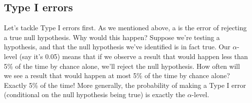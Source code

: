 




\subsection{Type I errors}



Let's tackle Type I errors first. As we mentioned above, a  is the error of rejecting a true null hypothesis. Why would this happen? Suppose we're testing a hypothesis, and that the null hypothesis we've identified is in fact true. Our $\alpha$-level (say it's 0.05) means that if we observe a result that would happen less than 5\% of the time by chance alone, we'll reject the null hypothesis. How often will we see a result that would happen at most 5\% of the time by chance alone? Exactly 5\% of the time!  More generally, the probability of making a Type I error (conditional on the null hypothesis being true) is exactly the $\alpha$-level.






